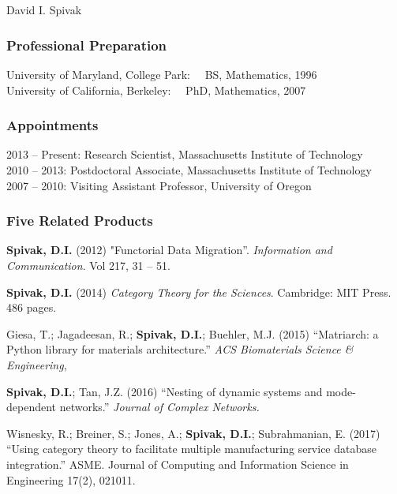 \documentclass[11pt,oneside,article]{memoir}
\theoremstyle{plain}
\theoremstyle{definition}
\theoremstyle{remark}
\begin{document}
\chapter*[Biographical Sketch]{}

\begin{center}\Large David I. Spivak\end{center}


\subsection{Professional Preparation}
University of Maryland, College Park: \ \ BS, Mathematics, 1996\\
University of California, Berkeley: \ \ PhD, Mathematics, 2007\\

\subsection{Appointments}
2013 -- Present: Research Scientist, Massachusetts Institute of Technology\\
2010 -- 2013: Postdoctoral Associate, Massachusetts Institute of Technology\\
2007 -- 2010: Visiting Assistant Professor, University of Oregon\\

\subsection{Five Related Products}
\begin{compactitem}
  \item \textbf{Spivak, D.I.} (2012) "Functorial Data Migration''.  \emph{Information and Communication}. Vol 217, 31 -- 51. 
  \item \textbf{Spivak, D.I.} (2014) \emph{Category Theory for the Sciences}. Cambridge: MIT Press. 486 pages. 
  \item Giesa, T.; Jagadeesan, R.; \textbf{Spivak, D.I.}; Buehler, M.J. (2015) ``Matriarch: a Python library for materials architecture.'' \emph{ACS Biomaterials Science \& Engineering}, %
  \item \textbf{Spivak, D.I.}; Tan, J.Z. (2016) ``Nesting of dynamic systems and mode-dependent networks.'' \emph{Journal of Complex Networks.} %
  \item Wisnesky, R.; Breiner, S.; Jones, A.; \textbf{Spivak, D.I.}; Subrahmanian, E. (2017) ``Using category theory to facilitate multiple manufacturing service database integration.'' ASME. Journal of Computing and Information Science in Engineering 17(2), 021011.
\end{compactitem}
\end{document}
